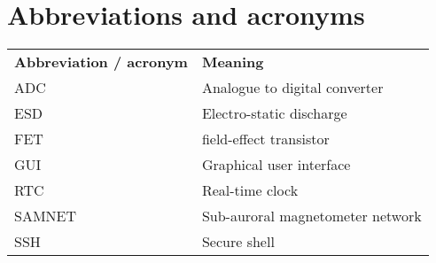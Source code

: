 \chapter{Abbreviations and acronyms}
\begin{table}[!h]
  \begin{center}
    \begin{tabular}{ll}
      \textbf{Abbreviation / acronym} & \textbf{Meaning} \\
      ADC & Analogue to digital converter \\
      ESD & Electro-static discharge\\
      FET & field-effect transistor\\
      GUI & Graphical user interface\\
      RTC & Real-time clock\\
      SAMNET & Sub-auroral magnetometer network\\
      SSH & Secure shell\\
    \end{tabular}
    \label{tab:-abbreviations}
  \end{center}
\end{table}
